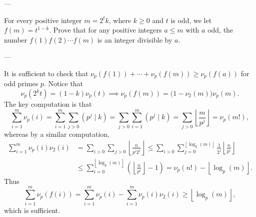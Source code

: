
---

For every positive integer $m=2^tk$, where $k\ge0$ and $t$ is odd, we let $f(m)=t^{1-k}$. Prove that for any positive integers $a\le m$ with $a$ odd, the number $f(1)f(2)\cdots f(m)$ is an integer divisible by $a$.

---

It is sufficient to check that $\nu_p(f(1))+\cdots+\nu_p(f(m))\ge\nu_p(f(a))$ for odd primes $p$. Notice that \[\nu_p(2^kt)=(1-k)\nu_p(t)\implies\nu_p(f(m))=\big(1-\nu_2(m)\big)\nu_p(m).\]
The key computation is that \[\sum_{i=1}^m\nu_p(i)=\sum_{i=1}^m\sum_{j>0}\left(p^j\mid k\right)=\sum_{j>0}\sum_{i=1}^m\left(p^j\mid k\right)=\sum_{j>0}\left\lfloor\frac m{p^j}\right\rfloor=\nu_p(m!),\]
whereas by a similar computation,
\begin{align*}
\sum_{i=1}^m\nu_p(i)\nu_2(i)&=\sum_{i>0}\sum_{j>0}\left\lfloor\frac n{p^i2^j}\right\rfloor\le\sum_{i>0}\sum_{j=0}^{\left\lfloor\log_2(m)\right\rfloor}\frac1{2^j}\left\lfloor \frac n{p^i}\right\rfloor\\
&\le\sum_{i=0}^{\left\lfloor\log_p(m)\right\rfloor}\left(\left\lfloor\frac n{p^i}\right\rfloor-1\right)=\nu_p(n!)-\left\lfloor\log_p(m)\right\rfloor.
\end{align*}
Thus \[\sum_{i=1}^m\nu_p(f(i))=\sum_{i=1}^m\nu_p(i)-\sum_{i=1}^m\nu_p(i)\nu_2(i)\ge\left\lfloor\log_p(m)\right\rfloor,\]
which is sufficient.
